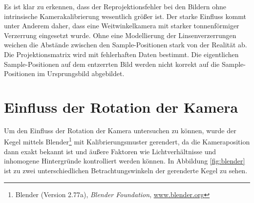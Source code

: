 Es ist klar zu erkennen, dass der Reprojektionsfehler bei den Bildern ohne intrinsische Kamerakalibrierung wesentlich größer ist. Der starke Einfluss kommt unter Anderem daher, dass eine Weitwinkelkamera mit starker tonnenförmiger Verzerrung eingesetzt wurde. Ohne eine Modellierung der Linsenverzerrungen weichen die Abstände zwischen den Sample-Positionen stark von der Realität ab. Die Projektionsmatrix wird mit fehlerhaften Daten bestimmt. Die eigentlichen Sample-Positionen auf dem entzerrten Bild werden nicht korrekt auf die Sample-Positionen im Ursprungsbild abgebildet.

\section{Einfluss der Rotation der Kamera}
Um den Einfluss der Rotation der Kamera untersuchen zu können, wurde der Kegel mittels Blender\footnote{Blender (Version 2.77a), \textit{Blender Foundation}, \url{www.blender.org}} mit Kalibrierungsmuster gerendert, da die Kameraposition dann exakt bekannt ist und äußere Faktoren wie Lichtverhältnisse und inhomogene Hintergründe kontrolliert werden können. In Abbildung \ref{fig:blender} ist zu zwei unterschiedlichen Betrachtungswinkeln der gerenderte Kegel zu sehen.

